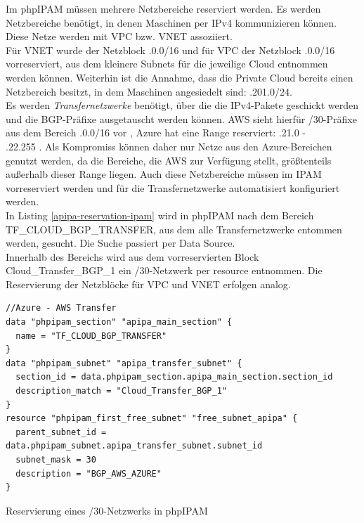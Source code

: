 Im phpIPAM müssen mehrere Netzbereiche reserviert werden. Es werden Netzbereiche benötigt, in denen Maschinen per IPv4 kommunizieren können. Diese Netze werden mit VPC bzw. VNET assoziiert.\\
Für VNET wurde der Netzblock .0.0/16\grqq{} und für VPC der Netzblock .0.0/16\grqq{} vorreserviert, aus dem kleinere Subnets für die jeweilige Cloud entnommen werden können. Weiterhin ist die Annahme, dass die Private Cloud bereits einen Netzbereich besitzt, in dem Maschinen angesiedelt sind: .201.0/24.\grqq{}\\
Es werden \textit{Transfernetzwerke}\label{transfer-azure-aws} benötigt, über die die IPv4-Pakete geschickt werden und die BGP-Präfixe ausgetauscht werden können. AWS sieht hierfür /30-Präfixe aus dem Bereich .0.0/16\grqq{} vor \cite{awsvpn2021}, Azure hat eine Range reserviert: .21.0\grqq{} -\\ .22.255\grqq{} \cite{azurebgp2020}. Als Kompromiss können daher nur Netze aus den Azure-Bereichen genutzt werden, da die Bereiche, die AWS zur Verfügung stellt, größtenteils außerhalb dieser Range liegen. Auch diese Netzbereiche müssen im IPAM vorreserviert werden und für die Transfernetzwerke automatisiert konfiguriert werden.\\
In Listing \ref{apipa-reservation-ipam} wird in phpIPAM nach dem Bereich \glqq TF\_CLOUD\_BGP\_TRANSFER\grqq{}, aus dem alle Transfernetzwerke entommen werden, gesucht. Die Suche passiert per Data Source.\\
Innerhalb des Bereichs wird aus dem vorreservierten Block \glqq Cloud\_Transfer\_BGP\_1\grqq{} ein /30-Netzwerk per resource entnommen. Die Reservierung der Netzblöcke für VPC und VNET erfolgen analog.
\begin{listing}[h]
\begin{verbatim}
//Azure - AWS Transfer
data "phpipam_section" "apipa_main_section" {
  name = "TF_CLOUD_BGP_TRANSFER"
}
data "phpipam_subnet" "apipa_transfer_subnet" {
  section_id = data.phpipam_section.apipa_main_section.section_id
  description_match = "Cloud_Transfer_BGP_1"
} 
resource "phpipam_first_free_subnet" "free_subnet_apipa" {
  parent_subnet_id = data.phpipam_subnet.apipa_transfer_subnet.subnet_id
  subnet_mask = 30
  description = "BGP_AWS_AZURE"
}
\end{verbatim}
\caption{Reservierung eines /30-Netzwerks in phpIPAM}
\label{apipa-reservation-ipam}
\end{listing}\FloatBarrier
